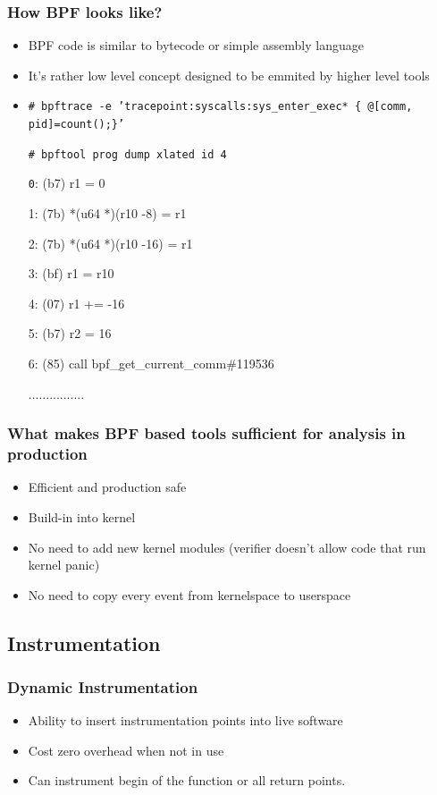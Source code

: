 \documentclass{beamer}
\begin{document}
\begin{frame}
  \frametitle{How BPF looks like?}
  \begin{itemize}
    \item<1-> BPF code is similar to bytecode or simple assembly language
    \item<2-> It's rather low level concept designed to be emmited by higher level tools
    \item<3-> {\scriptsize \texttt{\# bpftrace -e 'tracepoint:syscalls:sys\_enter\_exec* \{ @[comm, pid]=count();\}' }}
		\begin{block}{\scriptsize \texttt{\# bpftool prog dump xlated id 4}}
      {\texttt 
			 0: (b7) r1 = 0

			 1: (7b) *(u64 *)(r10 -8) = r1

			 2: (7b) *(u64 *)(r10 -16) = r1

			 3: (bf) r1 = r10

			 4: (07) r1 += -16

			 5: (b7) r2 = 16

			 6: (85) call bpf\_get\_current\_comm\#119536
			 
			 ................
      }
      \end{block}
  \end{itemize}
\end{frame}

\begin{frame}
  \frametitle{What makes BPF based tools sufficient for analysis in production}
  \begin{itemize}
    \item<1-> Efficient and production safe 
		\item<2-> Build-in into kernel
    \item<3-> No need to add new kernel modules (verifier doesn't allow code that run kernel panic)
		\item<4-> No need to copy every event from kernelspace to userspace 
	\end{itemize}
\end{frame}

\subsection{Instrumentation}
\begin{frame}
  \frametitle{Dynamic Instrumentation}
	\begin{itemize}
	  \item<1-> Ability to insert instrumentation points into live software
		\item<2-> Cost zero overhead when not in use
		\item<3-> Can instrument begin of the function or all return points.
	\end{itemize}
\end{frame}
\end{document}
